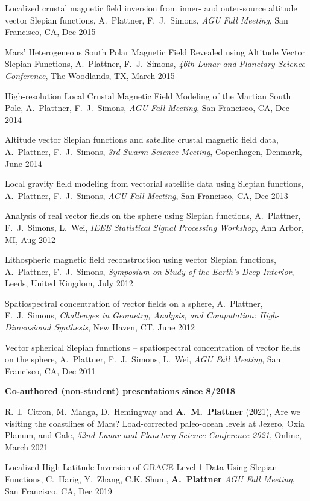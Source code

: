 \documentclass[10pt]{article}
\begin{document}
\spcp
Localized crustal magnetic field inversion from inner- and outer-source altitude vector Slepian functions,
A.~Plattner,  F.~J.~Simons,
\emph{AGU Fall Meeting}, San Francisco, CA, Dec 2015

\spcp
Mars' Heterogeneous South Polar Magnetic Field Revealed using Altitude Vector Slepian Functions,
A.~Plattner,  F.~J.~Simons,
\emph{46th Lunar and Planetary Science Conference}, The Woodlands, TX, March 2015

\spcp
High-resolution Local Crustal Magnetic Field Modeling of the Martian South Pole,
A.~Plattner,  F.~J.~Simons,
\emph{AGU Fall Meeting}, San Francisco, CA, Dec 2014

\spcp
Altitude vector Slepian functions and satellite crustal magnetic field data,
A.~Plattner,  F.~J.~Simons,
\emph{3rd Swarm Science Meeting}, Copenhagen, Denmark, June 2014

\spcp
Local gravity field modeling from vectorial satellite data using Slepian functions,
A.~Plattner,  F.~J.~Simons,
\emph{AGU Fall Meeting}, San Francisco, CA, Dec 2013

\spcp
Analysis of real vector fields on the sphere using Slepian functions,
A.~Plattner, F.~J.~Simons, L.~Wei,
\emph{IEEE Statistical Signal Processing Workshop}, Ann Arbor, MI, Aug 2012

\spcp
Lithospheric magnetic field reconstruction using vector Slepian functions,
A.~Plattner, F.~J.~Simons,
\emph{Symposium on Study of the Earth's Deep Interior}, Leeds, United Kingdom, July 2012

%

\spcp
Spatiospectral concentration of vector fields on a sphere,
A.~Plattner, F.~J.~Simons,
\emph{Challenges in Geometry, Analysis, and Computation: High-Dimensional Synthesis}, 
New Haven, CT, June 2012

\spcp
Vector spherical Slepian functions -- spatiospectral concentration of vector fields on the sphere,
A.~Plattner, F.~J.~Simons, L.~Wei,
\emph{AGU Fall Meeting}, San Francisco, CA, Dec 2011

\clearpage

\textbf{\tsize Co-authored (non-student) presentations since 8/2018}

\spcp
R.~I.~Citron, M.~Manga, D.~Hemingway and \textbf{A.~M.~Plattner} (2021),
Are we visiting the coastlines of Mars? Load-corrected paleo-ocean levels at Jezero, Oxia Planum, and Gale,
\emph{52nd Lunar and Planetary Science Conference 2021}, Online, March 2021

\spcp
Localized High-Latitude Inversion of GRACE Level-1 Data Using Slepian Functions,
C.~Harig, Y.~Zhang, C.K. Shum, \textbf{A.~Plattner}
\emph{AGU Fall Meeting}, San Francisco, CA, Dec 2019
\end{document}
